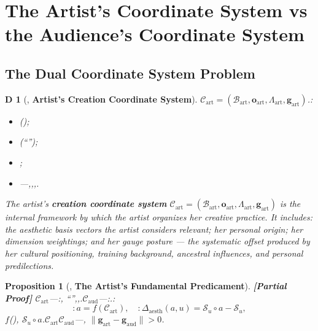 \documentclass[12pt,a4paper]{article}
\newtheorem{proposition}[theorem]{Proposition}
\newtheorem{definition}[theorem]Definition
\theoremstyle{remark}
\newcommand{\Sstates}{\mathcal{S}}
\newcommand{\norm}[1]{\|#1\|}
\newcommand{\AudCoord}{\mathcal{C}_{\text{aud}}}
\newcommand{\ArtCoord}{\mathcal{C}_{\text{art}}}
\newcommand{\AesthDelta}{\Delta_{\text{aesth}}}
\newcommand{\GParam}{\mathbf{g}}
\newcommand{\rigorPartial}{\textnormal{\textbf{[Partial Proof]}}}
\begin{document}
\section{The Artist's Coordinate System vs the Audience's Coordinate System}
\subsection{}
\subsection{The Dual Coordinate System Problem}
\begin{definition}[, \textbf{Artist's Creation Coordinate System}]
\label{def:artist_coords}
 $\ArtCoord = (\mathcal{B}_{\text{art}}, \mathbf{o}_{\text{art}}, \Lambda_{\text{art}}, \GParam_{\text{art}})$.: 
\begin{itemize}
 \item (); 
 \item (``''); 
 \item ; 
 \item ---,,,.
\end{itemize}
The artist's \textbf{creation coordinate system} $\ArtCoord = (\mathcal{B}_{\text{art}}, \mathbf{o}_{\text{art}}, \Lambda_{\text{art}}, \GParam_{\text{art}})$ is the internal framework by which the artist organizes her creative practice. It includes: the aesthetic basis vectors the artist considers relevant; her personal origin; her dimension weightings; and her gauge posture --- the systematic offset produced by her cultural positioning, training background, ancestral influences, and personal predilections.
\end{definition}
\begin{proposition}[, \textbf{The Artist's Fundamental Predicament}]\label{prop:artist_dilemma}\rigorPartial
$\ArtCoord$---:, ``'',,.$\AudCoord$---:.: 
\begin{equation}\label{eq:artist_dilemma}
 \text{} : a = f(\ArtCoord), \quad \text{} : \AesthDelta(a, u) = \Sstates_u \circ a - \Sstates_u,
\end{equation}
$f$(), $\Sstates_u \circ a$.$\ArtCoord$$\AudCoord$---, $\norm{\GParam_{\text{art}} - \GParam_{\text{aud}}} > 0$.
\end{proposition}
\subsection{}
\end{document}
